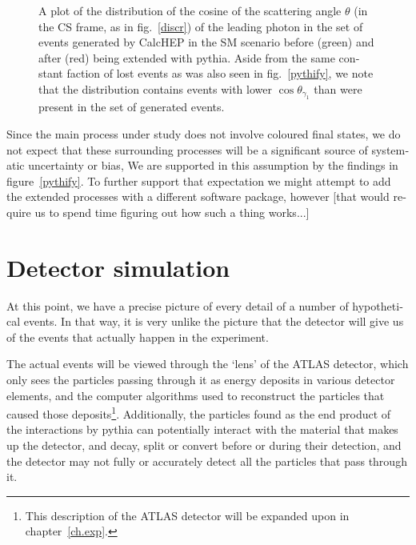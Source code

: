 \begin{english}
\begin{figure}[htp]
\begin{minipage}[b]{.65\textwidth}
\begin{infilsf} \tiny \makebox[0pt][l]{
\hspace{-1em}
}\end{infilsf}
\end{minipage}
\hfill\begin{minipage}[b]{.3\textwidth}
\caption{A plot of the distribution of the cosine of the scattering angle $\theta$ (in the CS frame, as in fig.~\ref{discr}) of the leading photon in the set of events generated by CalcHEP in the SM scenario before (green) and after (red) being extended with pythia. Aside from the same constant faction of lost events as was also seen in fig.~\ref{pythify}, we note that the distribution contains events with lower $\cos\theta_{\gamma_1}$ than were present in the set of generated events.
\label{pythicos}}
\end{minipage}
\end{figure}

Since the main process under study does not involve coloured final states, we do not expect that these surrounding processes will be a significant source of systematic uncertainty or bias, We are supported in this assumption by the findings in figure~\ref{pythify}. To further support that expectation we might attempt to add the extended processes with a different software package, however [that would require us to spend time figuring out how such a thing works...]

\section{Detector simulation}
At this point, we have a precise picture of every detail of a number of hypothetical events. In that way, it is very unlike the picture that the detector will give us of the events that actually happen in the experiment.

The actual events will be viewed through the `lens' of the ATLAS detector, which only sees the particles passing through it as energy deposits in various detector elements, and the computer algorithms used to reconstruct the particles that caused those deposits\footnote{This description of the ATLAS detector will be expanded upon in chapter~\ref{ch.exp}.}. Additionally, the particles found as the end product of the interactions by pythia can potentially interact with the material that makes up the detector, and decay, split or convert before or during their detection, and the detector may not fully or accurately detect all the particles that pass through it.


\end{english}
